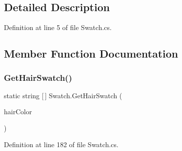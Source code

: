 \subsection{Detailed Description}


Definition at line 5 of file Swatch.\+cs.



\subsection{Member Function Documentation}
\mbox{\label{class_swatch_ad9aee8913b15b1cd21e4d734aeb00f6b}} 
\subsubsection{\texorpdfstring{GetHairSwatch()}{GetHairSwatch()}}
{\footnotesize\ttfamily static string \mbox{[}$\,$\mbox{]} Swatch.\+Get\+Hair\+Swatch (\begin{DoxyParamCaption}\item[{\mbox{\hyperlink{class_character_a7940fffce9bfadb9e7abf15490cf8bb0}{Character.\+Hair\+Color}}}]{hair\+Color }\end{DoxyParamCaption})\hspace{0.3cm}{\ttfamily [static]}}



Definition at line 182 of file Swatch.\+cs.

